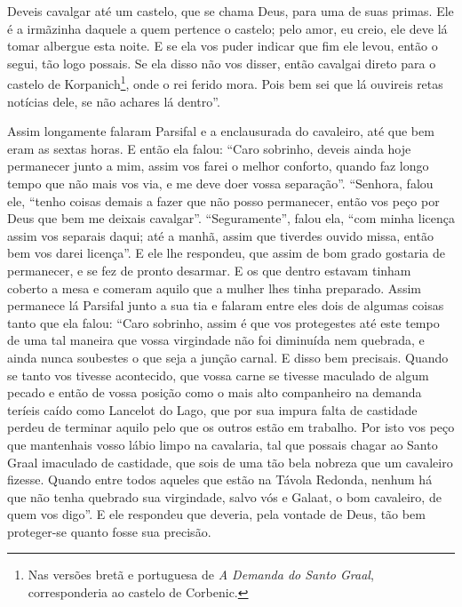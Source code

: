 Deveis cavalgar até um castelo, que se chama Deus, para uma de suas primas.
Ele é a irmãzinha daquele a quem pertence o castelo; pelo amor, eu creio, ele
deve lá tomar albergue esta noite. E se ela vos puder indicar que fim ele
levou, então o segui, tão logo possais. Se ela disso não vos disser, então
cavalgai direto para o castelo de Korpanich\footnote{ Nas versões bretã e
portuguesa de \textit{A Demanda do Santo Graal}, corresponderia ao castelo de
Corbenic.},  onde o rei ferido mora. Pois bem sei que lá ouvireis
retas notícias dele, se não achares lá dentro”. 

 Assim longamente falaram Parsifal e a enclausurada do cavaleiro, até que
bem eram as sextas horas. E então ela falou: “Caro sobrinho, deveis ainda hoje
permanecer junto a mim, assim vos farei o melhor conforto, quando faz longo
tempo que não mais vos via, e me deve doer vossa separação”. “Senhora, falou
ele, “tenho coisas demais a fazer que não posso permanecer, então vos peço por
Deus que bem me deixais cavalgar”. “Seguramente”, falou ela, “com minha licença
assim vos separais daqui; até a manhã, assim que tiverdes ouvido missa, então
bem vos darei licença”. E ele lhe respondeu, que assim de bom grado gostaria de
permanecer, e se fez de pronto desarmar. E os que dentro estavam tinham coberto
a mesa e comeram aquilo que a mulher lhes tinha preparado. Assim permanece lá
Parsifal junto a sua tia e falaram entre eles dois de algumas coisas tanto que
ela falou: “Caro sobrinho, assim é que  vos protegestes até este tempo de uma
tal maneira que vossa virgindade não foi diminuída nem quebrada, e ainda nunca
soubestes o que seja a junção carnal. E disso bem precisais. Quando se tanto
vos tivesse acontecido, que vossa carne se tivesse maculado de algum pecado e
então de vossa posição como o mais alto companheiro na demanda teríeis caído
como Lancelot do Lago, que por sua impura falta de castidade perdeu de
terminar aquilo pelo que os outros estão em trabalho. Por isto vos peço que
mantenhais vosso lábio limpo  na cavalaria, tal que
possais chagar ao Santo Graal imaculado de castidade, que sois de uma tão bela
nobreza que um cavaleiro fizesse. Quando entre todos aqueles que estão na
Távola Redonda, nenhum há que não tenha quebrado sua virgindade, salvo vós e
Galaat, o bom cavaleiro, de quem vos digo”. E ele respondeu
que deveria, pela vontade de Deus, tão bem proteger-se quanto fosse sua
precisão.  

